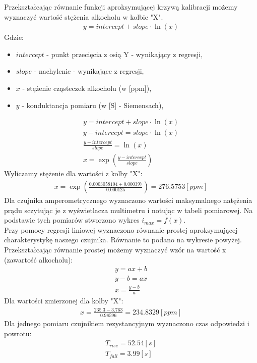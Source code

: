 \documentclass[11pt]{article}
\begin{document}
    \indent Przekształcając równanie funkcji aproksymującej krzywą kalibracji możemy wyznaczyć wartość stężenia alkocholu w kolbie "X".
    \begin{gather}
        y=intercept+slope\cdot \ln(x)
    \end{gather}
\noindent Gdzie:
    {\footnotesize
\begin{itemize}
    \setlength\itemsep{0em}
    \item[] \textbf{$intercept$} - punkt przecięcia z osią Y - wynikający z regresji,
    \item[] \textbf{$slope$} - nachylenie - wynikające z regresji,
    \item[] \textbf{$x$} - stężenie cząsteczek alkocholu (w [ppm]),
    \item[] \textbf{$y$} - konduktancja pomiaru (w [S] - Siemensach),
\end{itemize}}
    \begin{gather}
        y=intercept+slope\cdot \ln(x)\\
        y-intercept=slope\cdot \ln(x)\\
        \frac{y-intercept}{slope}=\ln(x)\\
        x=\exp(\frac{y-intercept}{slope})
    \end{gather}
    \indent Wyliczamy stężenie dla wartości z kolby "X":
    \begin{gather}
        x=\exp(\frac{0.0003058104+0.000397}{0.000125})=276.5753[ppm]
    \end{gather}
    \indent Dla czujnika amperometrycznego wyznaczono wartości maksymalnego natężenia prądu
    sczytując je z wyświetlacza multimetru i notując w tabeli pomiarowej. Na podstawie tych pomiarów
    stworzono wykres $i_{max}=f(x)$.\\
    \noindent\makebox[\textwidth]{
        \texttt{[image: /home/bork/IdeaProjects/LatexProjects/src/PodstawyTechnikiSensorowej/Lab4/Img/amperometricimax=f(x)]}}
    \indent Przy pomocy regresji liniowej wyznaczono równanie prostej aproksymującej charakterystykę naszego czujnika. Równanie to podano na
    wykresie powyżej. Przekształcając równanie prostej możemy wyznaczyć wzór na wartość x (zawartość alkocholu):
    \begin{gather}
        y=ax+b \\
        y-b=ax \\
        x=\frac{y-b}{a}
    \end{gather}
    \noindent Dla wartości zmierzonej dla kolby "X":
    \begin{gather}
        x=\frac{235.3-3.763}{0.98596}=234.8329[ppm]
    \end{gather}
    \newpage
    \indent Dla jednego pomiaru czujnikiem rezystancyjnym wyznaczono czas odpowiedzi i powrotu:\\
    \noindent{}
    \begin{gather*}
        T_{rise}=52.54[s]\\
        T_{fall}=3.99[s]
    \end{gather*}
\end{document}
